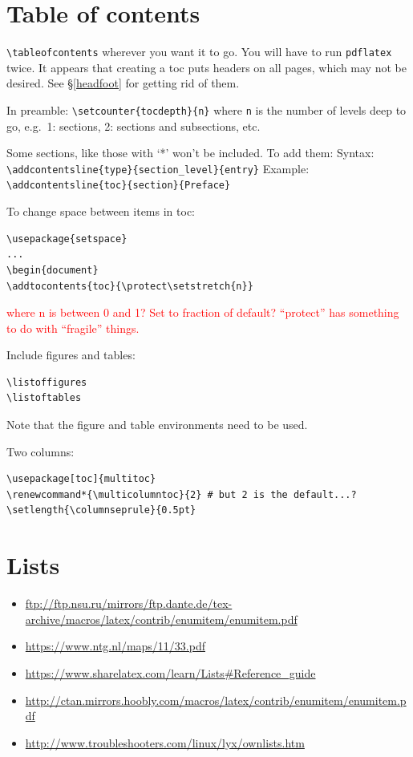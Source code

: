 \documentclass{article}
\renewcommand*{\multicolumntoc}{2}
\begin{document}
\section{Table of contents}
\verb|\tableofcontents| wherever you want it to go.
You will have to run \texttt{pdflatex} twice.
It appears that creating a toc puts headers on all pages, which may
not be desired. See \S{}\ref{headfoot} for getting rid of them.

In preamble:
\verb|\setcounter{tocdepth}{n}| where \verb|n| is the number of levels deep
to go, e.g.\ 1: sections, 2: sections and subsections, etc.

Some sections, like those with `*' won't be included. To add them:
Syntax: \verb|\addcontentsline{type}{section_level}{entry}|
Example: \verb|\addcontentsline{toc}{section}{Preface}|

To change space between items in toc:
\begin{verbatim}
\usepackage{setspace}
...
\begin{document}
\addtocontents{toc}{\protect\setstretch{n}}
\end{verbatim}
\textcolor{red}{where n is between 0 and 1? Set to fraction of default?
``protect'' has something to do with ``fragile'' things.}

Include figures and tables:
\begin{verbatim}
\listoffigures
\listoftables
\end{verbatim}
Note that the figure and table environments need to be used.

Two columns:
\begin{verbatim}
\usepackage[toc]{multitoc}
\renewcommand*{\multicolumntoc}{2} # but 2 is the default...?
\setlength{\columnseprule}{0.5pt}
\end{verbatim}

\section{Lists}
\begin{itemize}
    \item \url{ftp://ftp.nsu.ru/mirrors/ftp.dante.de/tex-archive/macros/latex/contrib/enumitem/enumitem.pdf}
    \item \url{https://www.ntg.nl/maps/11/33.pdf}
    \item \url{https://www.sharelatex.com/learn/Lists#Reference_guide}
    \item \url{http://ctan.mirrors.hoobly.com/macros/latex/contrib/enumitem/enumitem.pdf}
    \item \url{http://www.troubleshooters.com/linux/lyx/ownlists.htm}
\end{itemize}
\end{document}
